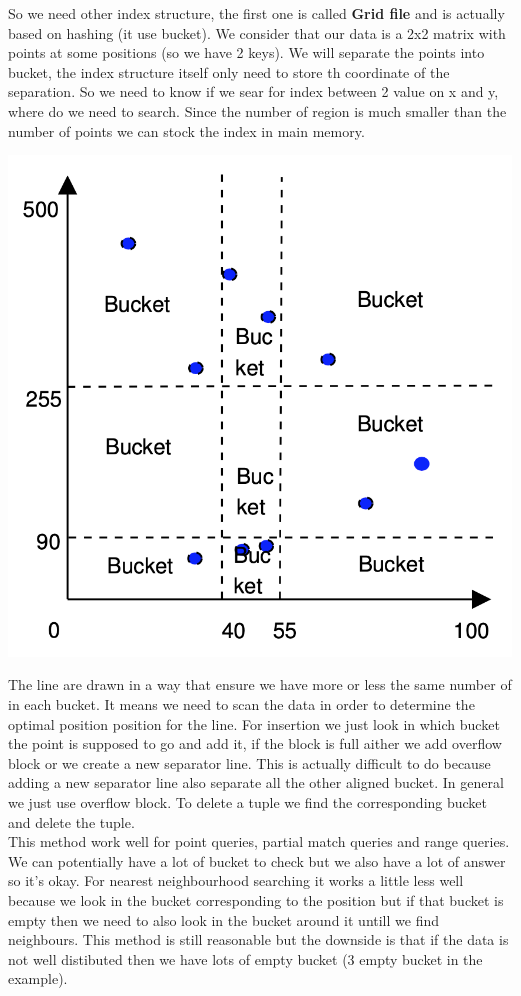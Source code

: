 \documentclass[12pt,a4paper]{article}
\begin{document}
So we need other index structure, the first one is called \textbf{Grid file} and is actually based on hashing (it use bucket). We consider that our data is a 2x2 matrix with points at some positions (so we have 2 keys). We will separate the points into bucket, the index structure itself only need to store th coordinate of the separation. So we need to know if we sear for index between 2 value on x and y, where do we need to search. Since the number of region is much smaller than the number of points we can stock the index in main memory. 
\begin{center}
\includegraphics[scale=0.45]{img/img53.png}
\end{center}
The line are drawn in a way that ensure we have more or less the same number 
of in each bucket. It means we need to scan the data in order to determine the optimal position position for the line. For insertion we just look in which bucket the point is supposed to go and add it, if the block is full aither we add overflow block or we create a new separator line. This is actually difficult to do because adding a new separator line also separate all the other aligned bucket. In general we just use overflow block. To delete a tuple we find the corresponding bucket and delete the tuple.\\
This method work well for point queries, partial match queries and range queries. We can potentially have a lot of bucket to check but we also have a lot of answer so it's okay. 
For nearest neighbourhood searching it works a little less well because we look in the bucket corresponding to the position but if that bucket is empty then we need to also look in the bucket around it untill we find neighbours. This method is still reasonable but the downside is that if the data is not well distibuted then we have lots of empty bucket (3 empty bucket in the example).\\
\end{document}
